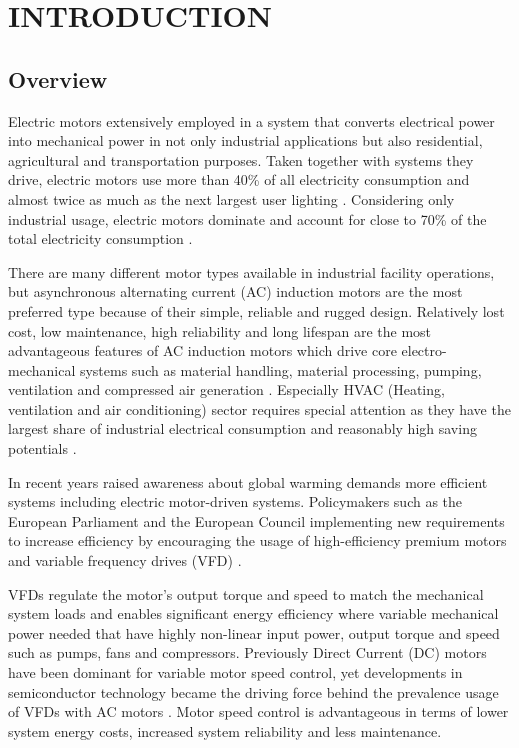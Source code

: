 \chapter{INTRODUCTION}\label{Ch1}
\section{Overview}
\label{overvıew}

Electric motors extensively employed in a system that converts electrical power into mechanical power in not only industrial applications but also residential, agricultural and transportation purposes. Taken together with systems they drive, electric motors use more than 40\% of all electricity consumption and almost twice as much as the next largest user lighting \cite{waide2011energy}. Considering only industrial usage, electric motors dominate and account for close to 70\% of the total electricity consumption \cite{waide2011energy,kulterer2014policy}.

There are many different motor types available in industrial facility operations, but asynchronous alternating current (AC) induction motors are the most preferred type because of their simple, reliable and rugged design. Relatively lost cost, low maintenance, high reliability and long lifespan are the most advantageous features of AC induction motors which drive core electro-mechanical systems such as material handling, material processing, pumping, ventilation and compressed air generation \cite{Fleiter2012EnergyEI}. Especially HVAC (Heating, ventilation and air conditioning) sector requires special attention as they have the largest share of industrial electrical consumption and reasonably high saving potentials \cite{Fleiter2012EnergyEI}.

In recent years raised awareness about global warming demands more efficient systems including electric motor-driven systems. Policymakers such as the European Parliament and the European Council implementing new requirements to increase efficiency by encouraging the usage of high-efficiency premium motors and variable frequency drives (VFD) \cite{kulterer2014policy,mikami2011historical}.

VFDs regulate the motor's output torque and speed to match the mechanical system loads and enables significant energy efficiency where variable mechanical power needed that have highly non-linear input power, output torque and speed such as pumps, fans and compressors. Previously Direct Current (DC) motors have been dominant for variable motor speed control, yet developments in semiconductor technology became the driving force behind the prevalence usage of VFDs with AC motors \cite{doe2008improving}. Motor speed control is advantageous in terms of lower system energy costs, increased system reliability and less maintenance.  

